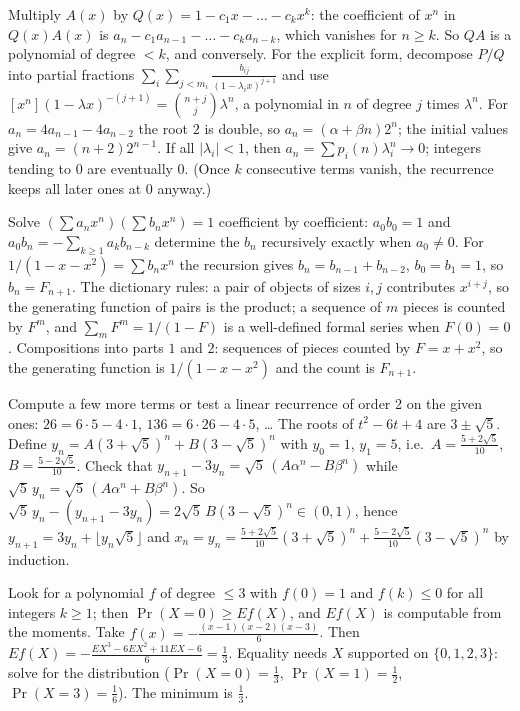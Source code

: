 \documentclass[11pt,a4paper]{article}
\begin{document}

Multiply \(A(x)\) by \(Q(x)=1-c_1x-\dots-c_kx^k\): the coefficient of \(x^n\) in \(Q(x)A(x)\) is \(a_n-c_1a_{n-1}-\dots-c_ka_{n-k}\), which vanishes for \(n\ge k\). So \(QA\) is a polynomial of degree \(\lt k\), and conversely.
For the explicit form, decompose \(P/Q\) into partial fractions \(\sum_i\sum_{j\lt m_i}\frac{b_{ij}}{(1-\lambda_ix)^{j+1}}\) and use \([x^n](1-\lambda x)^{-(j+1)}=\binom{n+j}{j}\lambda^n\), a polynomial in \(n\) of degree \(j\) times \(\lambda^n\). For \(a_n=4a_{n-1}-4a_{n-2}\) the root \(2\) is double, so \(a_n=(\alpha+\beta n)2^n\); the initial values give \(a_n=(n+2)2^{n-1}\).
If all \(\lvert\lambda_i\rvert\lt1\), then \(a_n=\sum p_i(n)\lambda_i^n\to0\); integers tending to \(0\) are eventually \(0\). (Once \(k\) consecutive terms vanish, the recurrence keeps all later ones at \(0\) anyway.)

Solve \((\sum a_nx^n)(\sum b_nx^n)=1\) coefficient by coefficient: \(a_0b_0=1\) and \(a_0b_n=-\sum_{k\ge1}a_kb_{n-k}\) determine the \(b_n\) recursively exactly when \(a_0\ne0\).
For \(1/(1-x-x^2)=\sum b_nx^n\) the recursion gives \(b_n=b_{n-1}+b_{n-2}\), \(b_0=b_1=1\), so \(b_n=F_{n+1}\). The dictionary rules: a pair of objects of sizes \(i,j\) contributes \(x^{i+j}\), so the generating function of pairs is the product; a sequence of \(m\) pieces is counted by \(F^m\), and \(\sum_m F^m=1/(1-F)\) is a well-defined formal series when \(F(0)=0\).
Compositions into parts \(1\) and \(2\): sequences of pieces counted by \(F=x+x^2\), so the generating function is \(1/(1-x-x^2)\) and the count is \(F_{n+1}\).

Compute a few more terms or test a linear recurrence of order 2 on the given ones: \(26=6\cdot5-4\cdot1\), \(136=6\cdot26-4\cdot5\), \ldots{} The roots of \(t^2-6t+4\) are \(3\pm\sqrt5\).
Define \(y_n=A(3+\sqrt5)^n+B(3-\sqrt5)^n\) with \(y_0=1\), \(y_1=5\), i.e.~\(A=\frac{5+2\sqrt5}{10}\), \(B=\frac{5-2\sqrt5}{10}\). Check that \(y_{n+1}-3y_n=\sqrt5\,(A\alpha^n-B\beta^n)\) while \(\sqrt5\,y_n=\sqrt5\,(A\alpha^n+B\beta^n)\).
So \(\sqrt5\,y_n-(y_{n+1}-3y_n)=2\sqrt5\,B(3-\sqrt5)^n\in(0,1)\), hence \(y_{n+1}=3y_n+\lfloor y_n\sqrt5\rfloor\) and \(x_n=y_n=\frac{5+2\sqrt5}{10}(3+\sqrt5)^n+\frac{5-2\sqrt5}{10}(3-\sqrt5)^n\) by induction.

Look for a polynomial \(f\) of degree \(\le3\) with \(f(0)=1\) and \(f(k)\le0\) for all integers \(k\ge1\); then \(\Pr(X=0)\ge E f(X)\), and \(Ef(X)\) is computable from the moments.
Take \(f(x)=-\frac{(x-1)(x-2)(x-3)}{6}\). Then \(Ef(X)=-\frac{EX^3-6EX^2+11EX-6}{6}=\frac13\). Equality needs \(X\) supported on \(\{0,1,2,3\}\): solve for the distribution (\(\Pr(X=0)=\frac13\), \(\Pr(X=1)=\frac12\), \(\Pr(X=3)=\frac16\)). The minimum is \(\frac13\).
\end{document}

